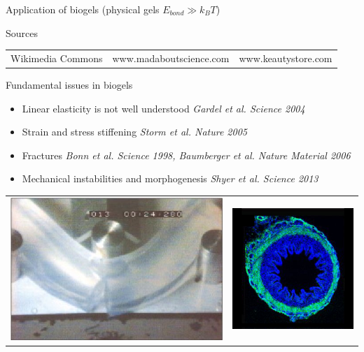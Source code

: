 \documentclass[xcolor=table]{beamer}
\begin{document}
\begin{frame}{Application of biogels \textup{\normalsize(physical gels
$E_{bond}\gg k_B T$)}}
\begin{footnotesize}
\begin{block}{Sources}
\begin{tabu}{lXl}
Wikimedia Commons & www.madaboutscience.com & www.keautystore.com\\
\end{tabu}
\end{block}
\end{footnotesize}
\end{frame}



\begin{frame}{Fundamental issues in biogels}
\begin{itemize}
\item Linear elasticity is not well understood \textit{\scriptsize Gardel et al. Science 2004}
\item Strain and stress stiffening \textit{\scriptsize Storm et al. Nature 2005}
\item Fractures \textit{\scriptsize Bonn et al. Science 1998, Baumberger et al. Nature Material 2006}
\item Mechanical instabilities and morphogenesis \textit{\scriptsize Shyer et al. Science 2013}
\end{itemize}
\begin{tabu}{X[c]X[c]}
\includegraphics[height=6\baselineskip]{Bonn_fracture} &
\includegraphics[height=6\baselineskip]{Villi_sq}

\end{tabu}
\end{frame}
\end{document}
